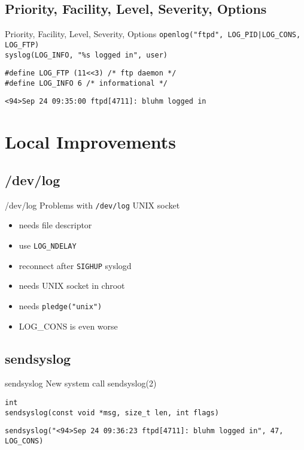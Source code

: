 \documentclass[14pt]{beamer}
\begin{document}
\subsection{Priority, Facility, Level, Severity, Options}
\begin{frame}{Priority, Facility, Level, Severity, Options}
    \texttt{openlog("ftpd", LOG\_PID|LOG\_CONS, LOG\_FTP)}\\
    \texttt{syslog(LOG\_INFO, "\%s logged in", user)}

    \vspace{.5cm}
    \texttt{\#define LOG\_FTP  (11<<3) /* ftp daemon */}\\
    \texttt{\#define LOG\_INFO 6       /* informational */ }

    \vspace{.5cm}
    \texttt{<94>Sep 24 09:35:00 ftpd[4711]:\ bluhm logged in}
\end{frame}

\section{Local Improvements}

\subsection{/dev/log}
\begin{frame}{/dev/log}
Problems with \texttt{/dev/log} UNIX socket
\begin{itemize}
    \item needs file descriptor
    \item use \texttt{LOG\_NDELAY}
    \item reconnect after \texttt{SIGHUP} syslogd
    \item needs UNIX socket in chroot
    \item needs \texttt{pledge("unix")}
    \item LOG\_CONS is even worse
\end{itemize}
\end{frame}

\subsection{sendsyslog}
\begin{frame}{sendsyslog}
    New system call sendsyslog(2)

    \vspace{.5cm}
    \texttt{int \\
    sendsyslog(const void *msg, size\_t len, int flags)}

    \vspace{.5cm}
    \texttt{sendsyslog("<94>Sep 24 09:36:23 ftpd[4711]:\
	bluhm logged in", 47, LOG\_CONS)}
\end{frame}
\end{document}
